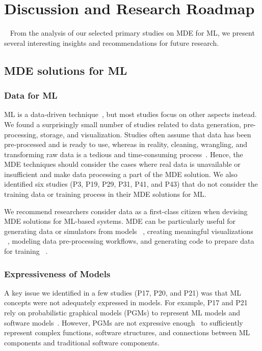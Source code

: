 \section{Discussion and Research Roadmap}~\label{sec:Discussion}
From the analysis of our selected primary studies on MDE for ML, we present several interesting insights and recommendations for future research.
\subsection{MDE solutions for ML}
\subsubsection{Data for ML}
ML is a data-driven technique~\cite{braun2018open}, but most studies focus on other aspects instead. We found a surprisingly small number of studies related to data generation, pre-processing, storage, and visualization. Studies often assume that data has been pre-processed and is ready to use, whereas in reality, cleaning, wrangling, and transforming raw data is a tedious and time-consuming process~\cite{duong2021review}. Hence, the MDE techniques should consider the cases where real data is unavailable or insufficient and make data processing a part of the MDE solution.
We also identified six studies (P3, P19, P29, P31, P41, and P43) that do not consider the training data or training process in their MDE solutions for ML.

We recommend researchers consider data as a first-class citizen when devising MDE solutions for ML-based systems. MDE can be particularly useful for generating data or simulators from models ~\cite{jahic2023semkis}, creating meaningful visualizations ~\cite{barzdins2022metamodel}, modeling data pre-processing workflows, and generating code to prepare data for training ~\cite{bhattacharjee2019stratum, ries2021mde}. 

\subsubsection{Expressiveness of Models}
A key issue we identified in a few studies (P17, P20, and P21) was that ML concepts were not adequately expressed in models. For example, P17 and P21 rely on probabilistic graphical models (PGMs) to represent ML models and software models~\cite{moin2022model}. However, PGMs are not expressive enough~\cite{moin2022model} to sufficiently represent complex functions, software structures, and connections between ML components and traditional software components.   

